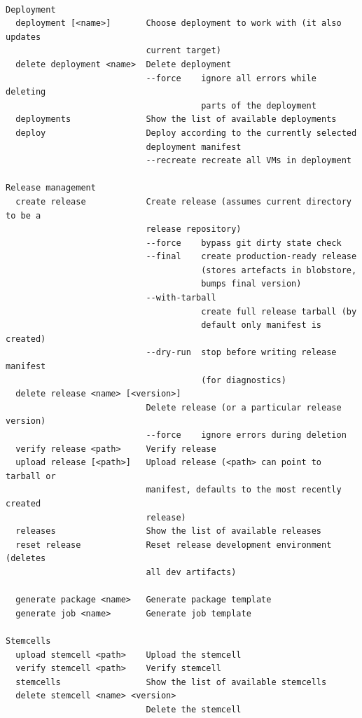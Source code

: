 \begin{adjustwidth}{2.5em}{2.5em}
\begin{verbatim}

Deployment
  deployment [<name>]       Choose deployment to work with (it also updates 
                            current target) 
  delete deployment <name>  Delete deployment 
                            --force    ignore all errors while deleting 
                                       parts of the deployment 
  deployments               Show the list of available deployments 
  deploy                    Deploy according to the currently selected 
                            deployment manifest 
                            --recreate recreate all VMs in deployment 

Release management
  create release            Create release (assumes current directory to be a 
                            release repository) 
                            --force    bypass git dirty state check 
                            --final    create production-ready release 
                                       (stores artefacts in blobstore, 
                                       bumps final version) 
                            --with-tarball 
                                       create full release tarball (by 
                                       default only manifest is created) 
                            --dry-run  stop before writing release manifest 
                                       (for diagnostics) 
  delete release <name> [<version>] 
                            Delete release (or a particular release version) 
                            --force    ignore errors during deletion 
  verify release <path>     Verify release 
  upload release [<path>]   Upload release (<path> can point to tarball or 
                            manifest, defaults to the most recently created 
                            release) 
  releases                  Show the list of available releases 
  reset release             Reset release development environment (deletes 
                            all dev artifacts) 

  generate package <name>   Generate package template 
  generate job <name>       Generate job template 

Stemcells
  upload stemcell <path>    Upload the stemcell 
  verify stemcell <path>    Verify stemcell 
  stemcells                 Show the list of available stemcells 
  delete stemcell <name> <version> 
                            Delete the stemcell 


\end{verbatim}
\end{adjustwidth}
